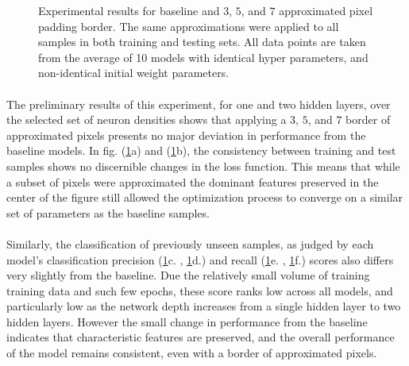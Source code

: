 \documentclass[12pt,letterpaper]{article}
\begin{document}
\begin{figure}[h]
	\caption{Experimental results for baseline and $3$, $5$, and $7$ approximated pixel padding border. The same approximations were applied to all samples in both training and testing sets. All data points are taken from the average of 10 models with identical hyper parameters, and non-identical initial weight parameters.}
	\label{results}
\end{figure}

\paragraph*{}The preliminary results of this experiment, for one and two hidden layers, over the selected set of neuron densities shows that applying a $3$, $5$, and $7$ border of approximated pixels presents no major deviation in performance from the baseline models. In fig. (\ref{results}a) and (\ref{results}b), the consistency between training and test samples shows no discernible changes in the loss function. This means that while a subset of pixels were approximated the dominant features preserved in the center of the figure still allowed the optimization process to converge on a similar set of parameters as the baseline samples.

\paragraph*{}Similarly, the classification of previously unseen samples, as judged by each model's classification precision (\ref{results}c. , \ref{results}d.) and recall (\ref{results}e. , \ref{results}f.) scores also differs very slightly from the baseline.  Due the relatively small volume of training training data and such few epochs, these score ranks low across all models, and particularly low as the network depth increases from a single hidden layer to two hidden layers. However the small change in performance from the baseline indicates that characteristic features are preserved, and the overall performance of the model remains consistent, even with a border of approximated pixels.


\end{document}
